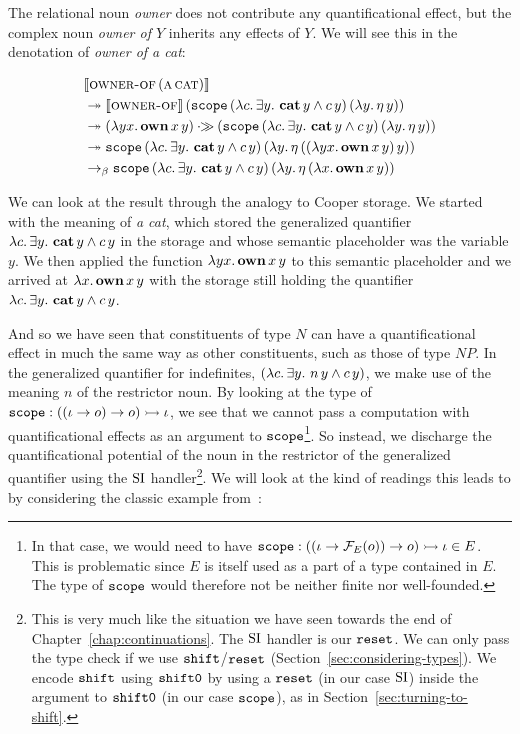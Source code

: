 The relational noun \emph{owner} does not contribute any quantificational
effect, but the complex noun \emph{owner of $Y$} inherits any effects of
$Y$. We will see this in the denotation of \emph{owner of a cat}:

\begin{align*}
&\llbracket \textsc{owner-of}\,(\textsc{a}\,\textsc{cat}) \rrbracket \\
&\twoheadrightarrow \llbracket \textsc{owner-of} \rrbracket\,(\mathtt{scope}\,(\lambda c.\, \exists y.\ \textbf{cat}\,y \land c\,y)\,(\lambda y.\, \eta\,y)) \\
&\twoheadrightarrow (\lambda y x.\, \textbf{own}\,x\,y) \mathbin{\cdot\!\!\gg} (\mathtt{scope}\,(\lambda c.\, \exists y.\ \textbf{cat}\,y \land c\,y)\,(\lambda y.\, \eta\,y)) \\
&\twoheadrightarrow \mathtt{scope}\,(\lambda c.\, \exists y.\ \textbf{cat}\,y \land c\,y)\,(\lambda y.\, \eta\,((\lambda y x.\, \textbf{own}\,x\,y)\,y)) \\
&\to_\beta \mathtt{scope}\,(\lambda c.\, \exists y.\ \textbf{cat}\,y \land c\,y)\,(\lambda y.\, \eta\,(\lambda x.\, \textbf{own}\,x\,y))
\end{align*}

We can look at the result through the analogy to Cooper storage. We started
with the meaning of \emph{a cat}, which stored the generalized quantifier
$\lam{c}{\exists y.\ \ap{\obj{cat}}{y} \land \ap{c}{y}}$ in the storage and
whose semantic placeholder was the variable $y$. We then applied the
function $\lambda y x.\, \textbf{own}\,x\,y$ to this semantic placeholder
and we arrived at $\lambda x.\, \textbf{own}\,x\,y$ with the storage still
holding the quantifier
$\lam{c}{\exists y.\ \ap{\obj{cat}}{y} \land \ap{c}{y}}$.

And so we have seen that constituents of type $N$ can have a
quantificational effect in much the same way as other constituents, such as
those of type $NP$. In the generalized quantifier for indefinites,
$(\lambda c.\, \exists y.\ n\,y \land c\,y)$, we make use of the
meaning $n$ of the restrictor noun. By looking at the type of
$\mathtt{scope} : ((\iota \to o) \to o) \rightarrowtail \iota$, we see that we
cannot pass a computation with quantificational effects as an argument to
$\mathtt{scope}$\footnote{In that case, we would need to have
  $\mathtt{scope} : ((\iota \to \mathcal{F}_E(o)) \to o) \rightarrowtail \iota \in E$. This is
  problematic since $E$ is itself used as a part of a type contained in
  $E$. The type of $\mathtt{scope}$ would therefore not be neither finite nor
  well-founded.}. So instead, we discharge the quantificational potential
of the noun in the restrictor of the generalized quantifier using the $\operatorname{SI}$
handler\footnote{This is very much like the situation we have seen towards
  the end of Chapter~\ref{chap:continuations}. The $\operatorname{SI}$ handler is our
  $\mathtt{reset}$. We can only pass the type check if we use $\mathtt{shift}$/$\mathtt{reset}$
  (Section~\ref{sec:considering-types}). We encode $\mathtt{shift}$ using $\mathtt{shift0}$
  by using a $\mathtt{reset}$ (in our case $\operatorname{SI}$) inside the argument to $\mathtt{shift0}$
  (in our case $\mathtt{scope}$), as in
  Section~\ref{sec:turning-to-shift}.}. We will look at the kind of
readings this leads to by considering the classic example
from~\cite{burchardt2004computational}:

